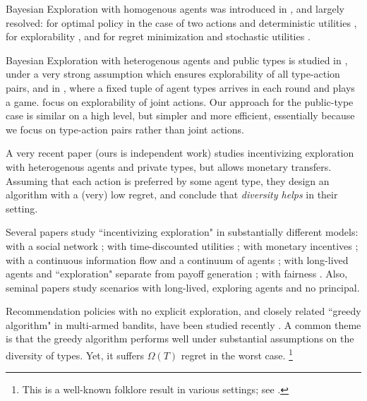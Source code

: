 
Bayesian Exploration with homogenous agents was introduced in \cite{Kremer-JPE14}, and largely resolved: for optimal policy in the case of two actions and deterministic utilities \cite{Kremer-JPE14}, for explorability \cite{ICexplorationGames-ec16}, and for regret minimization and stochastic utilities \cite{ICexploration-ec15}.

Bayesian Exploration with heterogenous agents and public types is studied in \cite{ICexploration-ec15}, under a very strong assumption which ensures explorability of all type-action pairs, and in \cite{ICexplorationGames-ec16}, where a fixed tuple of agent types arrives in each round and plays a game. \cite{ICexplorationGames-ec16} focus on explorability of joint actions. Our approach for the public-type case is similar on a high level, but simpler and more efficient, essentially because we focus on type-action pairs rather than joint actions.

A very recent paper \cite{Kempe-colt18} (ours is independent work) studies incentivizing exploration with heterogenous agents and private types, but allows monetary transfers. Assuming that each action is preferred by some agent type, they design an algorithm with a (very) low regret, and conclude that \emph{diversity helps} in their setting.

Several papers study ``incentivizing exploration" in substantially different models:
with a social network \cite{Bahar-ec16};
with time-discounted utilities \cite{Bimpikis-exploration-ms17};
with monetary incentives \cite{Frazier-ec14,Kempe-colt18};
with a continuous information flow and a continuum of agents \cite{Che-13};
with long-lived agents and ``exploration" separate from payoff generation \cite{Bobby-Glen-ec16,Annie-ec18-traps,Liang-ec18};
with fairness \cite{KKMPRVW17}. Also, seminal papers \cite{Bolton-econometrica99,Keller-econometrica05} study scenarios with
long-lived, exploring agents and no principal.

Recommendation policies with no explicit exploration, and closely related ``greedy algorithm" in multi-armed bandits, have been studied recently \cite{bastani2017exploiting,Sven-aistats18,kannan2018smoothed,externalities-colt18}.
A common theme is that the greedy algorithm performs well under  substantial assumptions on the diversity of types. Yet, it suffers $\Omega(T)$ regret in the worst case.%
\footnote{This is a well-known folklore result in various settings; \eg see \cite{CompetingBandits-itcs18,Sven-aistats18}.}


